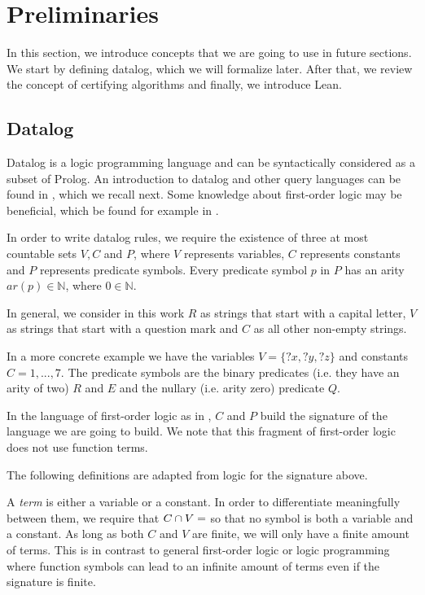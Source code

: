 \section{Preliminaries}


In this section, we introduce concepts that we are going to use in future sections. We start by defining datalog, which we will formalize later. After that, we review the concept of certifying algorithms and finally, we introduce Lean.


\subsection{Datalog}
Datalog is a logic programming language and can be syntactically considered as a subset of Prolog. An introduction to datalog and other query languages can be found in \cite{alice}, which we recall next. Some knowledge about first-order logic may be beneficial, which be found for example in \cite{logic}.

In order to write datalog rules, we require the existence of three at most countable sets $V, C$ and $P$, where $V$ represents variables, $C$ represents constants and $P$ represents predicate symbols. Every predicate symbol $p$ in $P$ has an arity $ar(p) \in \mathbb{N}$, where $0 \in \mathbb{N}$.

\begin{example}
    In general, we consider in this work $R$ as strings that start with a capital letter, $V$ as strings that start with a question mark and $C$ as all other non-empty strings.
\end{example}

\begin{example}
In a more concrete example we have the variables $V= \{?x,?y,?z\}$ and constants $C= {1,...,7}$. The predicate symbols are the binary predicates (i.e. they have an arity of two) $R$ and $E$ and the nullary (i.e. arity zero) predicate $Q$.
\end{example}

In the language of first-order logic as in \cite{logic}, $C$ and $P$ build the signature of the language we are going to build. We note that this fragment of first-order logic does not use function terms.

The following definitions are adapted from logic for the signature above.

A \textit{term} is either a variable or a constant. In order to differentiate meaningfully between them, we require that $C \cap V = \empty$ so that no symbol is both a variable and a constant. As long as both $C$ and $V$ are finite, we will only have a finite amount of terms. This is in contrast to general first-order logic or logic programming where function symbols can lead to an infinite amount of terms even if the signature is finite.

